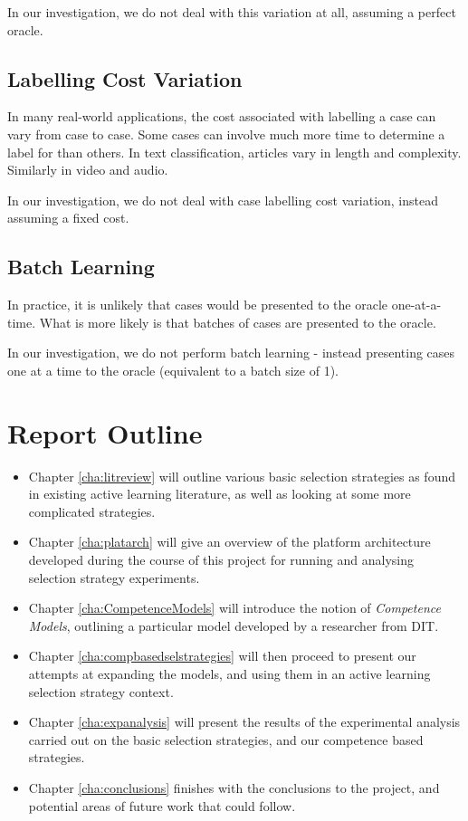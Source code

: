 \documentclass[a4paper,11pt]{report}
\begin{document}
In our investigation, we do not deal with this variation at all, assuming a perfect oracle.

\subsection{Labelling Cost Variation}
In many real-world applications, the cost associated with labelling a case can vary from case to case. Some cases can involve much more time to determine a label for than others. In text classification, articles vary in length and complexity. Similarly in video and audio.

In our investigation, we do not deal with case labelling cost variation, instead assuming a fixed cost.

\subsection{Batch Learning}
In practice, it is unlikely that cases would be presented to the oracle one-at-a-time. What is more likely is that batches of cases are presented to the oracle.

In our investigation, we do not perform batch learning - instead presenting cases one at a time to the oracle (equivalent to a batch size of 1).

\section{Report Outline}
\begin{itemize}
	\item Chapter \ref{cha:litreview} will outline various basic selection strategies as found in existing active learning literature, as well as looking at some more complicated strategies.
	\item Chapter \ref{cha:platarch} will give an overview of the platform architecture developed during the course of this project for running and analysing selection strategy experiments.
	\item Chapter \ref{cha:CompetenceModels} will introduce the notion of \emph{Competence Models}, outlining a particular model developed by a researcher from DIT. 
	\item Chapter \ref{cha:compbasedselstrategies} will then proceed to present our attempts at expanding the models, and using them in an active learning selection strategy context.
	\item Chapter \ref{cha:expanalysis} will present the results of the experimental analysis carried out on the basic selection strategies, and our competence based strategies.
	\item Chapter \ref{cha:conclusions} finishes with the conclusions to the project, and potential areas of future work that could follow.
\end{itemize}
\end{document}

